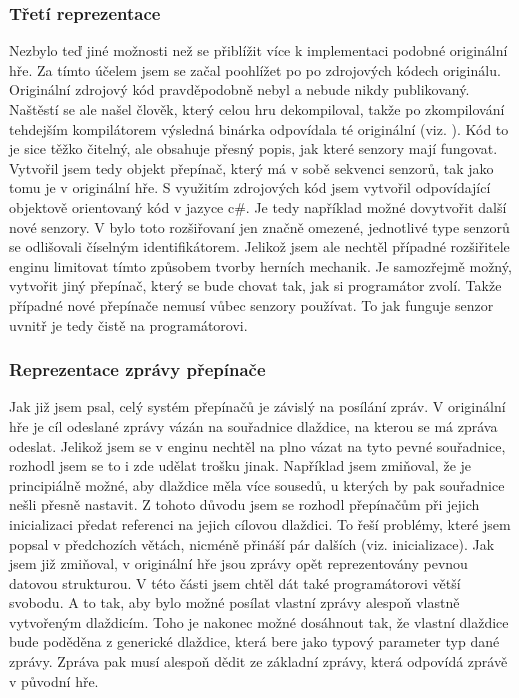 \subsubsection{Třetí reprezentace}
Nezbylo teď jiné možnosti než se přiblížit více k implementaci podobné originální hře. Za tímto účelem jsem se začal poohlížet po 
po zdrojových kódech originálu. Originální zdrojový kód pravděpodobně nebyl a nebude nikdy publikovaný. Naštěstí  se ale našel člověk,
který celou hru dekompiloval, takže po zkompilování tehdejším kompilátorem výsledná binárka odpovídala té originální (viz. \citet{DMDekompilation}).
Kód to je sice těžko čitelný, ale obsahuje přesný popis, jak které senzory mají fungovat. Vytvořil jsem tedy objekt přepínač, který má v sobě sekvenci senzorů, tak jako
tomu je v originální hře. S využitím zdrojových kód jsem vytvořil odpovídající objektově orientovaný kód v jazyce c\#. Je tedy například možné 
dovytvořit další nové senzory. V bylo toto rozšiřovaní jen značně omezené, jednotlivé type senzorů se odlišovali číselným identifikátorem.
Jelikož jsem ale nechtěl případné rozšiřitele enginu limitovat tímto způsobem tvorby herních mechanik. Je samozřejmě možný, vytvořit jiný přepínač, který se bude
chovat tak, jak si programátor zvolí. Takže případné nové přepínače nemusí vůbec senzory používat. To jak funguje senzor uvnitř je tedy čistě na
programátorovi.

\subsubsection{Reprezentace zprávy přepínače}
Jak již jsem psal,  celý systém přepínačů je závislý na posílání zpráv. V originální hře je cíl odeslané zprávy vázán na souřadnice dlaždice, na kterou 
se má zpráva odeslat. Jelikož jsem se v enginu nechtěl na plno vázat na tyto pevné souřadnice, rozhodl jsem se to i 
zde udělat trošku jinak. Například jsem zmiňoval, že je principiálně možné, aby dlaždice měla více sousedů, u kterých by pak souřadnice
nešli přesně nastavit. Z tohoto důvodu jsem se rozhodl přepínačům při jejich inicializaci předat referenci na jejich cílovou dlaždici. 
To řeší problémy, které jsem popsal v předchozích větách, nicméně přináší pár dalších (viz. inicializace). Jak jsem již zmiňoval,
v originální hře jsou zprávy opět reprezentovány pevnou datovou strukturou. V této části jsem chtěl dát také programátorovi větší svobodu. 
A to tak, aby bylo možné posílat vlastní zprávy alespoň vlastně vytvořeným dlaždicím. Toho je nakonec možné dosáhnout tak, že vlastní dlaždice bude 
poděděna z generické dlaždice, která bere jako typový parameter typ dané zprávy. Zpráva pak musí alespoň dědit ze základní zprávy, která odpovídá
zprávě v původní hře.

